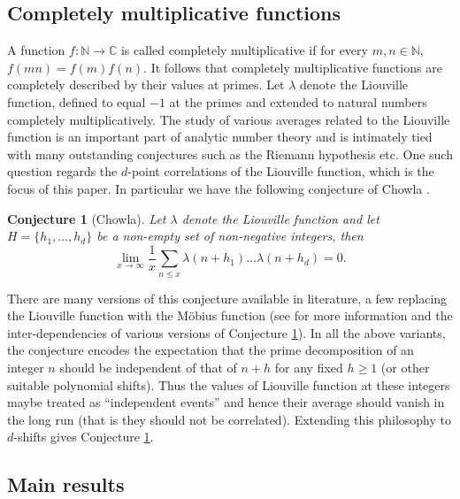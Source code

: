 \documentclass[12pt, a4paper]{amsart}
\newtheorem{conjecture}{Conjecture}
\theoremstyle{remark}
\theoremstyle{proof}
\numberwithin{equation}{section}
\numberwithin{assumption}{section}
\newcommand{\C}{\mathbb{C}}
\newcommand{\N}{\mathbb{N}}
\begin{document}
	\subsection{Completely multiplicative functions}
	A function $f : \N\to\C$ is called completely multiplicative if for every $m,n\in \N$, $f(mn) = f(m)f(n)$. It follows that completely multiplicative functions are completely described by their values at primes. Let $\lambda$ denote the Liouville function, defined to equal $-1$ at the primes and extended to natural numbers completely multiplicatively. The study of various averages related to the Liouville function is an important part of analytic number theory and is intimately tied with many outstanding conjectures such as the Riemann hypothesis etc. One such question regards the $d$-point correlations of the Liouville function, which is the focus of this paper. In particular we have the following conjecture of Chowla \cite{ChowlaConjecture}. 
	\begin{conjecture}[Chowla]\label{Conjecture "Chowla"}
		Let $\lambda$ denote the Liouville function and let $H = \{h_1, \ldots, h_d\}$ be a non-empty set of non-negative integers, then
		\begin{equation}\label{Equation "Chowla conjecture"}
			\lim_{x\to\infty}\frac{1}{x} \sum_{n\leqslant x} \lambda(n+h_1)\ldots\lambda(n+h_d) = 0.
		\end{equation}
	\end{conjecture}
	There are many versions of this conjecture available in literature, a few replacing the Liouville function with the M\"obius function (see \cite{RamareChowla} for more information and the inter-dependencies of various versions of Conjecture \ref{Conjecture "Chowla"}). In all the above variants, the conjecture encodes the expectation that the prime decomposition of an integer $n$ should be independent of that of $n+h$ for any fixed $h \geqslant 1$ (or other suitable polynomial shifts). Thus the values of Liouville function at these integers maybe treated as ``independent events'' and hence their average should vanish in the long run (that is they should not be correlated). Extending this philosophy to $d$-shifts gives Conjecture \ref{Conjecture "Chowla"}.

	\subsection{Main results}
	
\end{document}
